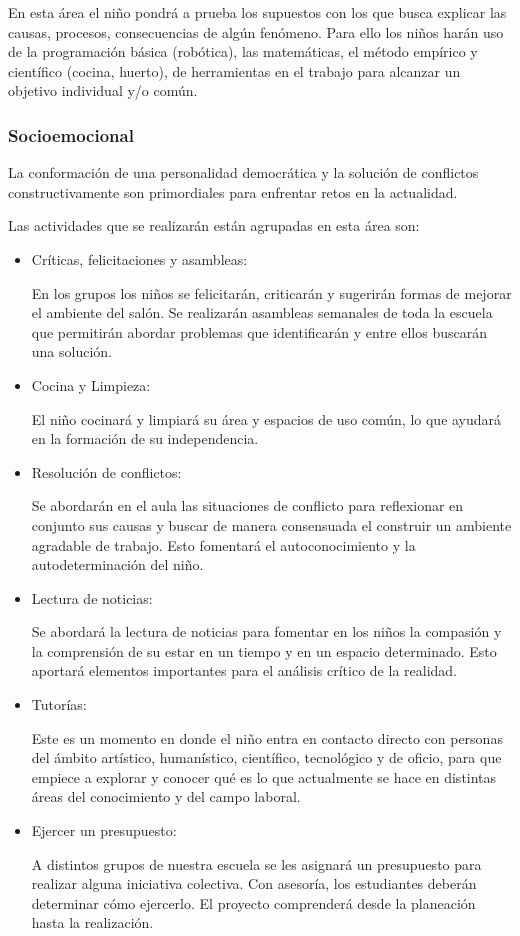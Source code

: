 \documentclass[10pt,letterpaper,oneside]{book}
\begin{document}
En esta área el niño pondrá a prueba los supuestos con los que busca explicar las causas, procesos, consecuencias de algún fenómeno. Para ello los niños harán uso de la programación básica (robótica), las matemáticas, el método empírico y científico (cocina, huerto), de herramientas en el trabajo para alcanzar un objetivo individual y/o común. 

\subsubsection{Socioemocional}

La conformación de una personalidad democrática y la solución de conflictos constructivamente son primordiales para enfrentar retos en la actualidad. 

\vspace{0.5cm}
Las actividades que se realizarán están agrupadas en esta área son: 
\begin{itemize}
\item Críticas, felicitaciones y asambleas:

En los grupos los niños se felicitarán, criticarán y sugerirán formas de mejorar el ambiente del salón. Se realizarán asambleas semanales de toda la escuela que permitirán abordar problemas que identificarán y entre ellos buscarán una solución. 

\item Cocina y Limpieza:

El niño cocinará y limpiará su área y espacios de uso común, lo que ayudará en la formación de su independencia. 

\item Resolución de conflictos:
	
Se abordarán en el aula las situaciones de conflicto para reflexionar en conjunto sus causas y buscar de manera consensuada el construir un ambiente agradable de trabajo. Esto fomentará el autoconocimiento y la autodeterminación del niño.

\item Lectura de noticias:

Se abordará la lectura de noticias para fomentar en los niños la compasión y la comprensión de su estar en un tiempo y en un espacio determinado. Esto aportará elementos importantes para el análisis crítico de la realidad.

\item Tutorías:

Este es un momento en donde el niño entra en contacto directo con personas del ámbito artístico, humanístico, científico, tecnológico y de oficio, para que empiece a explorar y conocer qué es lo que actualmente se hace en distintas áreas del conocimiento y del campo laboral.

\item Ejercer un presupuesto:

A distintos grupos de nuestra escuela se les asignará un presupuesto para realizar alguna iniciativa colectiva. Con asesoría, los estudiantes deberán determinar cómo ejercerlo. El proyecto comprenderá desde la planeación hasta la realización.

\end{itemize}
\end{document}
